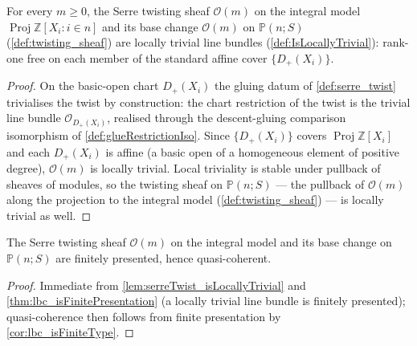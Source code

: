 \begin{lemma}\leanok
  \label{lem:serreTwist_isLocallyTrivial}
  For every \(m \ge 0\), the Serre twisting sheaf \(\mathcal{O}(m)\) on
  the integral model \(\operatorname{Proj} \mathbb{Z}[X_i : i \in n]\)
  and its base change \(\mathcal{O}(m)\) on \(\mathbb{P}(n; S)\)
  (\cref{def:twisting_sheaf}) are locally trivial line bundles
  (\cref{def:IsLocallyTrivial}): rank-one free on each member of the
  standard affine cover \(\{D_+(X_i)\}\).
\end{lemma}
\begin{proof}\leanok
  On the basic-open chart \(D_+(X_i)\) the gluing datum of
  \cref{def:serre_twist} trivialises the twist by construction: the
  chart restriction of the twist is the trivial line bundle
  \(\mathcal{O}_{D_+(X_i)}\), realised through the descent-gluing
  comparison isomorphism of \cref{def:glueRestrictionIso}. Since
  \(\{D_+(X_i)\}\) covers \(\operatorname{Proj} \mathbb{Z}[X_i]\) and
  each \(D_+(X_i)\) is affine (a basic open of a homogeneous element of
  positive degree), \(\mathcal{O}(m)\) is locally trivial. Local
  triviality is stable under pullback of sheaves of modules, so the
  twisting sheaf on \(\mathbb{P}(n; S)\) --- the pullback of
  \(\mathcal{O}(m)\) along the projection to the integral model
  (\cref{def:twisting_sheaf}) --- is locally trivial as well.
\end{proof}

\begin{corollary}\leanok
  \label{cor:serreTwist_isFinitePresentation}
  The Serre twisting sheaf \(\mathcal{O}(m)\) on the integral model and
  its base change on \(\mathbb{P}(n; S)\) are finitely presented, hence
  quasi-coherent.
\end{corollary}
\begin{proof}\leanok
  Immediate from \cref{lem:serreTwist_isLocallyTrivial} and
  \cref{thm:lbc_isFinitePresentation} (a locally trivial line bundle is
  finitely presented); quasi-coherence then follows from finite
  presentation by \cref{cor:lbc_isFiniteType}.
\end{proof}

